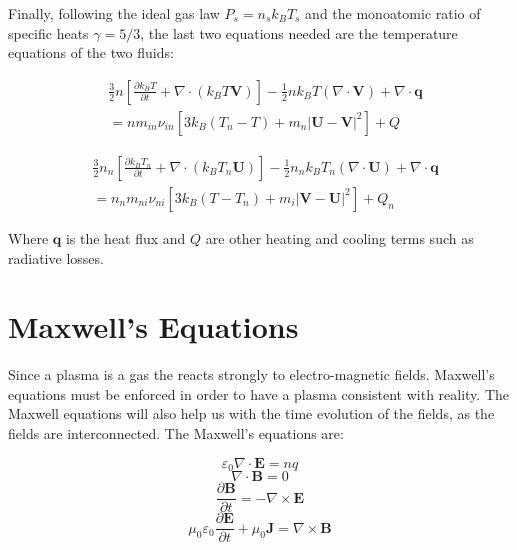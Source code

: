 \documentclass[12pt,upcase]{umlthesis}
\begin{document}
Finally, following the ideal gas law $P_s = n_s k_B T_s$ and the monoatomic ratio of specific heats $\gamma = 5/3$, the last two equations needed are the temperature equations of the two fluids:

\begin{equation}\label{eq:temperatureion}
	\begin{aligned}
		&\frac{3}{2} n [\frac{\partial k_B T}{\partial t} + \nabla\cdot(k_B T \textbf{V})] - \frac{1}{2} n k_B T (\nabla\cdot\textbf{V}) + \nabla\cdot\textbf{q} \\
	& = n m_{in} \nu_{in} [ 3 k_B (T_n - T) + m_n \lvert \textbf{U} - \textbf{V} \rvert^2 ] + Q
	\end{aligned}
\end{equation}

\begin{equation}\label{eq:temperatureneutral}
	\begin{aligned}
		&\frac{3}{2} n_n [\frac{\partial k_B T_n}{\partial t} + \nabla\cdot(k_B T_n \textbf{U})] - \frac{1}{2} n_n k_B T_n (\nabla\cdot\textbf{U}) + \nabla\cdot\textbf{q} \\
	&= n_n m_{ni} \nu_{ni} [ 3 k_B (T - T_n) + m_i \lvert \textbf{V} - \textbf{U} \rvert^2 ] + Q_n
	\end{aligned}
\end{equation}

Where $\textbf{q}$ is the heat flux and $Q$ are other heating and cooling terms such as radiative losses.


\section{Maxwell's Equations}

Since a plasma is a gas the reacts strongly to electro-magnetic fields. Maxwell's equations must be enforced in order to have a plasma consistent with reality. The Maxwell equations will also help us with the time evolution of the fields, as the fields are interconnected. The Maxwell's equations are:

\begin{equation}\label{eq:gausslaw}
	\varepsilon_0\nabla\cdot\textbf{E} = n q
\end{equation}
\begin{equation}\label{eq:maggausslaw}
	\nabla\cdot\textbf{B} = 0
\end{equation}
\begin{equation}\label{eq:lawofinduction}
	\frac{\partial\textbf{B}}{\partial t} = - \nabla\times\textbf{E}
\end{equation}
\begin{equation}\label{eq:ampereslaw}
	\mu_0\varepsilon_0\frac{\partial\textbf{E}}{\partial t} + \mu_0\textbf{J} = \nabla\times\textbf{B}
\end{equation}
\end{document}
